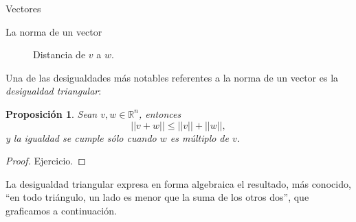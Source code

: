 \documentclass[a4paper,12pt,twoside,spanish,reqno]{amsbook}
\numberwithin{equation}{section}
\newtheorem{proposicion}[teorema]{Proposici\'on}
\theoremstyle{definition}
\theoremstyle{remark}
\newcommand{\R}{\mathbb R}
\begin{document}
\begin{chapter}{Vectores}
\begin{section}{La norma de un vector}
\begin{figure}[h]
    \caption{Distancia de $v$ a $w$.}\label{fig-distancia-de-vectores}
\end{figure}


Una de las desigualdades más notables referentes a la norma de un vector es la \textit{desigualdad triangular}:

\begin{proposicion}
    Sean $v, w \in \R^n$, entonces
    \begin{equation*}
        ||v+w|| \le ||v||+||w||,
    \end{equation*}
    y la igualdad se cumple sólo cuando $w$ es múltiplo de $v$. 
\end{proposicion}
\begin{proof}
    Ejercicio. 
\end{proof}

La desigualdad triangular expresa en forma algebraica el resultado, más conocido, ``en todo triángulo, un lado es menor que la suma de los otros dos'', que graficamos a continuación.


\end{section}
\end{chapter}
\end{document}
